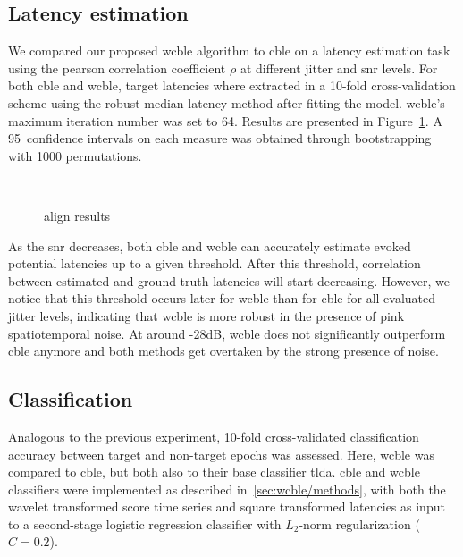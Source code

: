 \subsection{Latency estimation}
We compared our proposed \ac{wcble} algorithm to \ac{cble} on a latency
estimation task using the pearson correlation coefficient $\rho$ at different
jitter and \ac{snr} levels.
For both \ac{cble} and \ac{wcble}, target latencies where extracted in a
10-fold cross-validation scheme using the robust median latency method after
fitting the model.
\Ac{wcble}'s maximum iteration number was set to 64.
Results are presented in Figure~\ref{fig:wcble/results/latency}.
A 95\ confidence intervals on each measure was obtained through bootstrapping
with 1000 permutations.

\begin{figure}[!ht]
   \\
  
  \caption{align results}
  \label{fig:wcble/results/latency}
\end{figure}

As the \ac{snr} decreases, both \ac{cble} and \ac{wcble} can accurately
estimate evoked potential latencies up to a given threshold. After this
threshold, correlation between estimated and ground-truth latencies will start
decreasing.
However, we notice that this threshold occurs later for \ac{wcble} than for
\ac{cble} for all evaluated jitter levels, indicating that \ac{wcble} is more
robust in the presence of pink spatiotemporal noise.
At around -28dB, \ac{wcble} does not significantly outperform \ac{cble}
anymore and both methods get overtaken by the strong presence of noise.


\subsection{Classification}
Analogous to the previous experiment, 10-fold cross-validated classification
accuracy between target and non-target epochs was assessed.
Here, \ac{wcble} was compared to \ac{cble}, but both also to their base classifier
\ac{tlda}.
\Ac{cble} and \ac{wcble} classifiers were implemented as described
in~\ref{sec:wcble/methods}, with both the wavelet transformed score time series
and square transformed latencies as input to a second-stage logistic regression
classifier with $L_2$-norm regularization ($C=0.2$).

